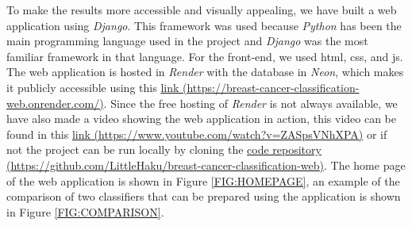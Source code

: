 
To make the results more accessible and visually appealing, we have built a web application using \textit{Django}. This framework was used because \textit{Python} has been the main programming language used in the project and \textit{Django} was the most familiar framework in that language. For the front-end, we used \ac{html}, \ac{css}, and \ac{js}. The web application is hosted in \textit{Render} with the database in \textit{Neon}, which makes it publicly accessible using this \href{https://breast-cancer-classification-web.onrender.com/}{link (https://breast-cancer-classification-web.onrender.com/)}. Since the free hosting of \textit{Render} is not always available, we have also made a video showing the web application in action, this video can be found in this \href{https://www.youtube.com/watch?v=ZASpsVNhXPA}{link (https://www.youtube.com/watch?v=ZASpsVNhXPA)} or if not the project can be run locally by cloning the \href{https://github.com/LittleHaku/breast-cancer-classification-web}{code repository (https://github.com/LittleHaku/breast-cancer-classification-web)}.
The home page of the web application is shown in Figure \ref{FIG:HOMEPAGE}, an example of the comparison of two classifiers that can be prepared using the application is shown in Figure \ref{FIG:COMPARISON}.